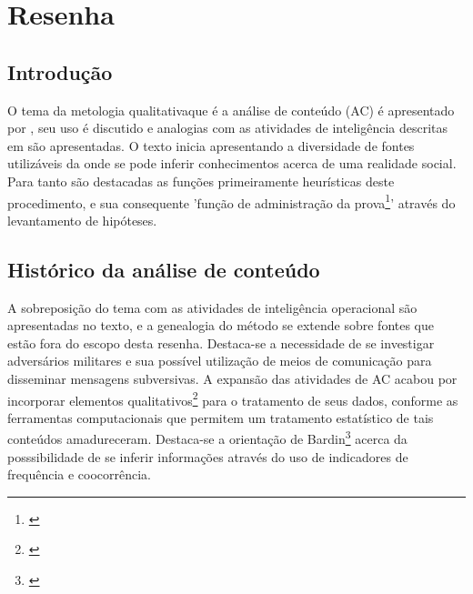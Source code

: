 \documentclass[
   article,       %
   12pt,          %
   oneside,       %
   a4paper,       %
   english,       %
   brazil,           %
   sumario=tradicional
   ]{abntex2}
\begin{document}




\frenchspacing 


\maketitle


\newpage

\textual
\section{Resenha}

\subsection{Introdução}

O tema da metologia qualitativaque é a análise de conteúdo (AC) é apresentado por \cite{bardin_epistemologia}, seu uso é discutido e analogias com as atividades de inteligência descritas em \cite{FM_2-0} são apresentadas. O texto inicia apresentando a diversidade de fontes utilizáveis da onde se pode inferir conhecimentos acerca de uma realidade social. Para tanto são destacadas as funções primeiramente heurísticas deste procedimento, e sua consequente 'função de administração da prova\footnote{\cite[p.288]{bardin_epistemologia}}' através do levantamento de hipóteses.


\subsection{Histórico da análise de conteúdo}

A sobreposição do tema com as atividades de inteligência operacional são apresentadas no texto, e a genealogia do método se extende sobre fontes que estão fora do escopo desta resenha. Destaca-se a necessidade de se investigar adversários militares e sua possível utilização de meios de comunicação para disseminar mensagens subversivas. A expansão das atividades de AC acabou por incorporar elementos qualitativos\footnote{\cite[p.289-290]{bardin_epistemologia}} para o tratamento de seus dados, conforme as ferramentas computacionais que permitem um tratamento estatístico de tais conteúdos amadureceram. Destaca-se a orientação de Bardin\footnote{\cite[p.290]{bardin_epistemologia}} acerca da posssibilidade de se inferir informações através do uso de indicadores de frequência e coocorrência.
\end{document}
